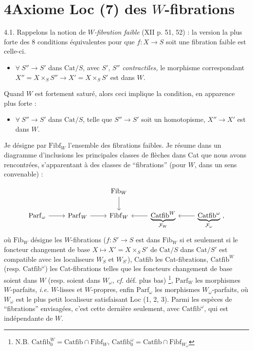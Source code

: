 \documentclass[11pt]{article}
\newcommand{\printedpage}[1]{\marginpar{\footnotesize p.~#1}}
\newcommand{\msp}[1]{\marginpar{\footnotesize [#1]}}
\newcommand{\Cat}{\mathrm{Cat}}
\newcommand{\Fib}{\mathrm{Fib}}
\newcommand{\Fibf}{\mathrm{Fibf}}
\newcommand{\Parf}{\mathrm{Parf}}
\newcommand{\Catfib}{\mathrm{Catfib}}
\begin{document}
\printedpage{19}

\section*{4\quad Axiome Loc (7) des $W$-fibrations}

4.1. Rappelons la notion de \textit{$W$-fibration faible} (XII p. 51, 52) : la version la plus forte des 8 conditions équivalentes pour que $f : X \longrightarrow S$ soit une fibration faible est celle-ci.

\begin{itemize}[leftmargin=2cm]
\item[\textbf{(Ff)}] $\forall\ S'' \longrightarrow S'$ dans $\Cat/S$, avec $S'$, $S''$ \textit{contractiles,} le morphisme correspondant $X'' = X \times_S S'' \longrightarrow X' = X \times_S S'$ est dans $W$.
\end{itemize}

Quand $W$ est fortement saturé, alors ceci implique la condition, en apparence plus forte :

\begin{itemize}[leftmargin=2cm]
\item[\textbf{(Ff$'$)}] $\forall\ S'' \longrightarrow S'$ dans $\Cat/S$, telle que $S'' \longrightarrow S'$ soit un homotopisme, $X'' \longrightarrow X'$ est dans $W$.
\end{itemize}

Je désigne par $\Fibf_W$ l'ensemble des fibrations faibles. Je résume dans un diagramme d'inclusions les principales classes de flèches dans Cat que nous avons rencontrées, s'apparentant à des classes de “fibrations” (pour $W$, dans un sens convenable) :

\msp{page 28}

\[
\begin{tikzcd}
 & & \Fib_W \arrow[d] & & \\
\Parf_\omega \arrow[r] & \Parf_W \arrow[r] & \Fibf_W & \underbrace{\Catfib^W}_{\mathcal{F}_W} \arrow[l] & \underbrace{\Catfib^\omega}_{\mathcal{F}_\omega} \arrow[l] \ ,
\end{tikzcd}
\]
où $\Fib_W$ désigne les $W$-fibrations ($f : S' \longrightarrow S$ est dans $\Fib_W$ si et seulement si le foncteur changement de base $X \longmapsto X' = X \times_S S'$ de $\Cat/S$ dans $\Cat/S'$ est compatible avec les localiseurs $W_S$ et $W_{S'}$), Catfib les Cat-fibrations, $\Catfib^W$ (resp. $\Catfib^\omega$) les Cat-fibrations telles que les foncteurs changement de base soient dans $W$ (resp. soient dans $W_\omega$, \textit{cf.} déf. plus bas) \footnote[20]{N.B. $\Catfib_0^W = \Catfib \cap \Fibf_W$, $\Catfib_0^\omega = \Catfib \cap \Fibf_{W_\omega}$}, $\Parf_W$ les morphismes $W$-parfaits, \textit{i.e.} $W$-lisses et $W$-propres, enfin $\Parf_\omega$ les morphismes $W_\omega$-parfaits, où $W_\omega$ est le plus petit localiseur satisfaisant Loc (1, 2, 3). Parmi les espèces de “fibrations” envisagées, c'est cette dernière seulement, avec $\Catfib^\omega$, qui est indépendante de $W$.
\end{document}
